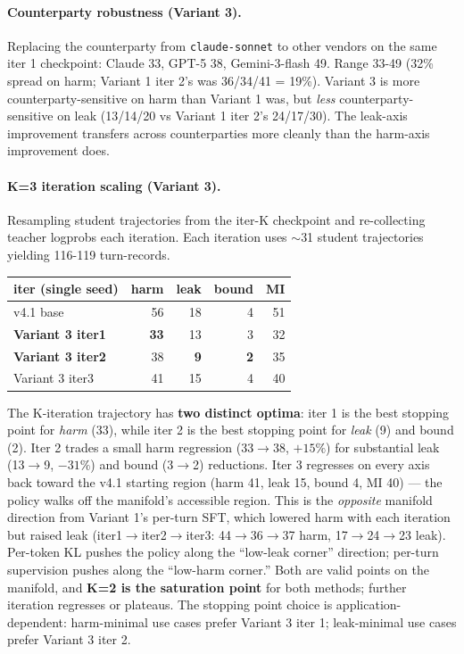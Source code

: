 \documentclass[11pt]{article}
\begin{document}
\paragraph{Counterparty robustness (Variant 3).} Replacing the counterparty from \texttt{claude-sonnet} to other vendors on the same iter 1 checkpoint: Claude 33, GPT-5 38, Gemini-3-flash 49. Range 33-49 (32\% spread on harm; Variant 1 iter 2's was 36/34/41 = 19\%). Variant 3 is more counterparty-sensitive on harm than Variant 1 was, but \emph{less} counterparty-sensitive on leak (13/14/20 vs Variant 1 iter 2's 24/17/30). The leak-axis improvement transfers across counterparties more cleanly than the harm-axis improvement does.

\paragraph{K=3 iteration scaling (Variant 3).} Resampling student trajectories from the iter-K checkpoint and re-collecting teacher logprobs each iteration. Each iteration uses $\sim$31 student trajectories yielding 116-119 turn-records.

\begin{center}\small
\begin{tabular}{l r r r r}
\toprule
iter (single seed)        & harm    & leak  & bound & MI    \\
\midrule
v4.1 base                 & 56      & 18    & 4     & 51    \\
\textbf{Variant 3 iter1}  & \textbf{33}      & 13         & 3                & 32    \\
\textbf{Variant 3 iter2}  & 38      & \textbf{9} & \textbf{2}       & 35    \\
Variant 3 iter3           & 41      & 15         & 4                & 40    \\
\bottomrule
\end{tabular}
\end{center}

The K-iteration trajectory has \textbf{two distinct optima}: iter 1 is the best stopping point for \emph{harm} (33), while iter 2 is the best stopping point for \emph{leak} (9) and bound (2). Iter 2 trades a small harm regression (33$\rightarrow$38, $+15\%$) for substantial leak (13$\rightarrow$9, $-31\%$) and bound (3$\rightarrow$2) reductions. Iter 3 regresses on every axis back toward the v4.1 starting region (harm 41, leak 15, bound 4, MI 40) --- the policy walks off the manifold's accessible region. This is the \emph{opposite} manifold direction from Variant 1's per-turn SFT, which lowered harm with each iteration but raised leak (iter1$\rightarrow$iter2$\rightarrow$iter3: 44$\rightarrow$36$\rightarrow$37 harm, 17$\rightarrow$24$\rightarrow$23 leak). Per-token KL pushes the policy along the ``low-leak corner'' direction; per-turn supervision pushes along the ``low-harm corner.'' Both are valid points on the manifold, and \textbf{K=2 is the saturation point} for both methods; further iteration regresses or plateaus. The stopping point choice is application-dependent: harm-minimal use cases prefer Variant 3 iter 1; leak-minimal use cases prefer Variant 3 iter 2.
\end{document}
